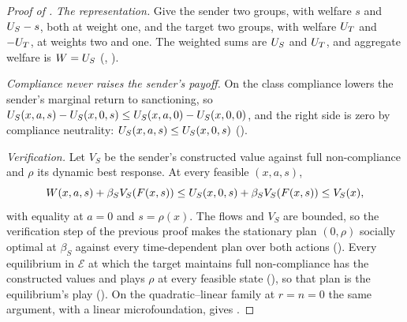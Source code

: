 \begin{proof}[Proof of ]
\emph{The representation.} Give the sender two groups, with welfare $s$ and
$U_S-s$, both at weight one, and the target two groups, with welfare $U_T$ and
$-U_T$, at weights two and one. The weighted sums are $U_S$ and $U_T$, and
aggregate welfare is $W=U_S$ (,
).

\emph{Compliance never raises the sender's payoff.} On the class compliance lowers
the sender's marginal return to sanctioning, so
$U_S(x,a,s)-U_S(x,0,s)\le U_S(x,a,0)-U_S(x,0,0)$, and the right side is zero by
compliance neutrality: $U_S(x,a,s)\le U_S(x,0,s)$ ().

\emph{Verification.} Let $V_S$ be the sender's constructed value against full
non-compliance and $\rho$ its dynamic best response. At every feasible $(x,a,s)$,
\[
W(x,a,s)+\beta_SV_S(F(x,s))\le U_S(x,0,s)+\beta_SV_S(F(x,s))\le V_S(x),
\]
with equality at $a=0$ and $s=\rho(x)$. The flows and $V_S$ are bounded, so the
verification step of the previous proof makes the stationary plan $(0,\rho)$
socially optimal at $\beta_S$ against every time-dependent plan over both actions
(). Every equilibrium in $\mathcal E$ at which
the target maintains full non-compliance has the constructed values and plays $\rho$ at every
feasible state (), so that plan is the
equilibrium's play (). On the
quadratic--linear family at $r=n=0$ the same argument, with a linear
microfoundation, gives .
\end{proof}
